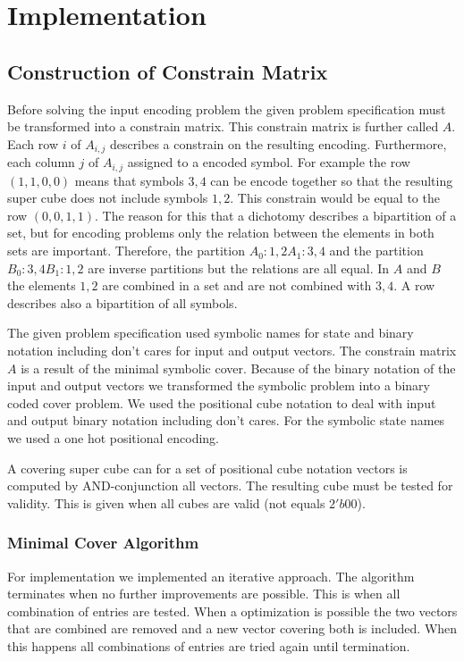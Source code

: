 \chapter{Implementation}

\section{Construction of Constrain Matrix}
Before solving the input encoding problem the given problem specification must be transformed into a constrain matrix. This constrain matrix is further called $A$. Each row $i$ of $A_{i,j}$ describes a constrain on the resulting encoding. Furthermore, each column $j$ of $A_{i,j}$ assigned to a encoded symbol. For example the row $(1,1,0,0)$ means that symbols $3, 4$ can be encode together so that the resulting super cube does not include symbols $1, 2$. This constrain would be equal to the row $(0,0,1,1)$. The reason for this that a dichotomy describes a bipartition of a set, but for encoding problems only the relation between the elements in both sets are important. Therefore, the partition $A_0:{1,2} A_1:{3,4}$ and the partition $B_0:{3,4} B_1:{1,2}$ are inverse partitions but the relations are all equal. In $A$ and $B$ the elements $1, 2$ are combined in a set and are not combined with $3, 4$. A row describes also a bipartition of all symbols.

The given problem specification used symbolic names for state and binary notation including don't cares for input and output vectors. The constrain matrix $A$ is a result of the minimal symbolic cover. Because of the binary notation of the input and output vectors we transformed the symbolic problem into a binary coded cover problem. We used the positional cube notation to deal with input and output binary notation including don't cares. For the symbolic state names we used a one hot positional encoding. 

A covering super cube can for a set of positional cube notation vectors is computed by AND-conjunction all vectors. The resulting cube must be tested for validity. This is given when all cubes are valid (not equals $2'b00$).

\subsection{Minimal Cover Algorithm}
For implementation we implemented an iterative approach. The algorithm terminates when no further improvements are possible. This is when all combination of entries are tested. When a optimization is possible the two vectors that are combined are removed and a new vector covering both is included. When this happens all combinations of entries are tried again until termination.

